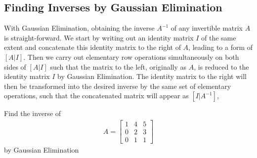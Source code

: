 \subsection{Finding Inverses by Gaussian Elimination}
\label{subsection:invGauss}
With Gaussian Elimination, obtaining the inverse $A^{-1}$ of any invertible matrix $A$ is straight-forward. We start by writing out an identity matrix $I$ of the same extent and concatenate this identity matrix to the right of $A$, leading to a form of $[A|I]$. Then we carry out elementary row operations simultaneously on both sides of $[A|I]$ such that the matrix to the left, originally as $A$, is reduced to the identity matrix $I$ by Gaussian Elimination. The identity matrix to the right will then be transformed into the desired inverse by the same set of elementary operations, such that the concatenated matrix will appear as $[I|A^{-1}]$, 
\begin{exmp}
Find the inverse of
\begin{align*}
A =
\begin{bmatrix}
1 & 4 & 5 \\
0 & 2 & 3 \\
0 & 1 & 1
\end{bmatrix}
\end{align*}
by Gaussian Elimination
\end{exmp}
